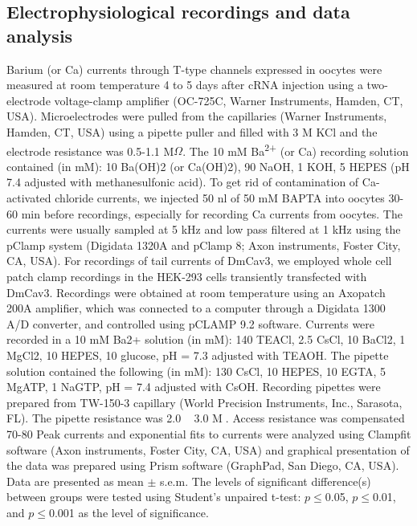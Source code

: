 \subsection*{Electrophysiological recordings and data analysis}

Barium (or Ca) currents through T-type channels expressed in oocytes were measured at room temperature 4 to 5 days after cRNA injection using a two-electrode voltage-clamp amplifier (OC-725C, Warner Instruments, Hamden, CT, USA).
Microelectrodes were pulled from the capillaries (Warner Instruments, Hamden, CT, USA) using a pipette puller and filled with 3 M KCl and the electrode resistance was 0.5-1.1 M$\Omega$.
The 10 mM Ba\textsuperscript{2+} (or Ca) recording solution contained (in mM): 10 Ba(OH)2 (or Ca(OH)2), 90 NaOH, 1 KOH, 5 HEPES (pH 7.4 adjusted with methanesulfonic acid).
To get rid of contamination of Ca-activated chloride currents, we injected 50 nl of 50 mM BAPTA into oocytes 30-60 min before recordings, especially for recording Ca currents from oocytes.
The currents were usually sampled at 5 kHz and low pass filtered at 1 kHz using the pClamp system (Digidata 1320A and pClamp 8; Axon instruments, Foster City, CA, USA). 
For recordings of tail currents of DmCav3, we employed whole cell patch clamp recordings in the HEK-293 cells transiently transfected with DmCav3. Recordings were obtained at room temperature using an Axopatch 200A amplifier, which was connected to a computer through a Digidata 1300 A/D converter, and controlled using pCLAMP 9.2 software. Currents were recorded in a 10 mM Ba2+ solution (in mM): 140 TEACl, 2.5 CsCl, 10 BaCl2, 1 MgCl2, 10 HEPES, 10 glucose, pH = 7.3 adjusted with TEAOH. The pipette solution contained the following (in mM): 130 CsCl, 10 HEPES, 10 EGTA, 5 MgATP, 1 NaGTP, pH = 7.4 adjusted with CsOH. Recording pipettes were prepared from TW-150-3 capillary (World Precision Instruments, Inc., Sarasota, FL). The pipette resistance was 2.0 ~ 3.0 M. Access resistance was compensated 70-80%
Peak currents and exponential fits to currents were analyzed using Clampfit software (Axon instruments, Foster City, CA, USA) and graphical presentation of the data was prepared using Prism software (GraphPad, San Diego, CA, USA). 
Data are presented as mean $\pm$ s.e.m.
The levels of significant difference(s) between groups were tested using Student's unpaired t-test: $p\le$0.05, $p\le$0.01, and $p\le$0.001 as the level of significance.
